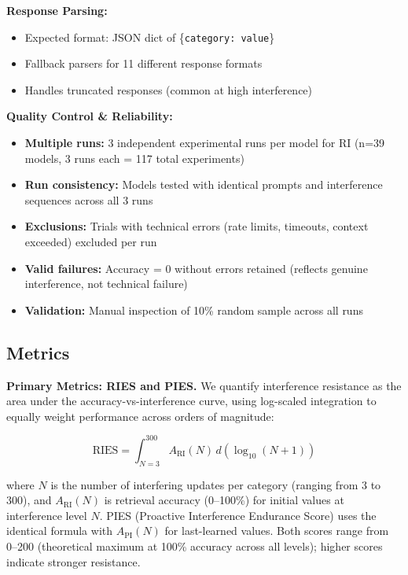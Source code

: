 \documentclass{article}
\begin{document}
\textbf{Response Parsing:}
\begin{itemize}[itemsep=2pt,topsep=3pt,parsep=0pt]
    \item Expected format: JSON dict of \{\texttt{category: value}\}
    \item Fallback parsers for 11 different response formats
    \item Handles truncated responses (common at high interference)
\end{itemize}

\textbf{Quality Control \& Reliability:}
\begin{itemize}[itemsep=2pt,topsep=3pt,parsep=0pt]
    \item \textbf{Multiple runs:} 3 independent experimental runs per model for RI (n=39 models, 3 runs each = 117 total experiments)
    \item \textbf{Run consistency:} Models tested with identical prompts and interference sequences across all 3 runs
    \item \textbf{Exclusions:} Trials with technical errors (rate limits, timeouts, context exceeded) excluded per run
    \item \textbf{Valid failures:} Accuracy = 0 without errors retained (reflects genuine interference, not technical failure)
    \item \textbf{Validation:} Manual inspection of 10\% random sample across all runs
\end{itemize}

\subsection{Metrics}

\textbf{Primary Metrics: RIES and PIES.}
We quantify interference resistance as the area under the accuracy-vs-interference curve, using log-scaled integration to equally weight performance across orders of magnitude:

\begin{equation}
\text{RIES} = \int_{N=3}^{300} A_{\text{RI}}(N) \, d(\log_{10}(N + 1))
\end{equation}

where $N$ is the number of interfering updates per category (ranging from 3 to 300), and $A_{\text{RI}}(N)$ is retrieval accuracy (0--100\%) for initial values at interference level $N$. PIES (Proactive Interference Endurance Score) uses the identical formula with $A_{\text{PI}}(N)$ for last-learned values. Both scores range from 0--200 (theoretical maximum at 100\% accuracy across all levels); higher scores indicate stronger resistance.
\end{document}
